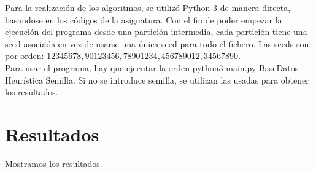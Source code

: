 Para la realización de los algoritmos, se utilizó Python 3 de manera directa, basandose en los códigos de la asignatura. Con el fin de poder empezar la ejecución del programa desde una partición intermedia, cada partición tiene una seed asociada en vez de usarse una única seed para todo el fichero. Las seeds son, por orden: $12345678,90123456,78901234,456789012,34567890$. \\

Para usar el programa, hay que ejecutar la orden  python3 main.py BaseDatos Heurística Semilla. Si no se introduce semilla, se utilizan las usadas para obtener los resultados.
\newpage
\section{Resultados}

Mostramos los resultados.\\

